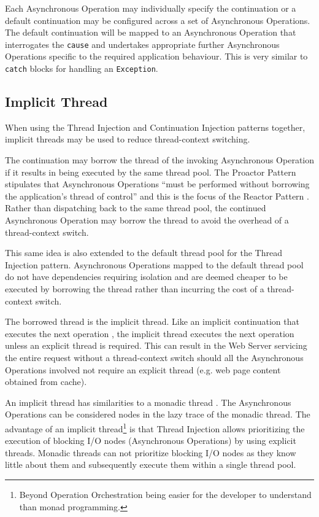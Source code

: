 \documentclass[prodmode]{style/acmlarge}
\begin{document}
Each Asynchronous Operation may individually specify the continuation or a
default continuation may be configured across a set of Asynchronous Operations.
The default continuation will be mapped to an Asynchronous Operation that
interrogates the \texttt{cause} and undertakes appropriate further Asynchronous
Operations specific to the required application behaviour.  This is very similar
to \texttt{catch} blocks for handling an \texttt{Exception}.


\subsection{Implicit Thread}

When using the Thread Injection and Continuation Injection patterns together,
implicit threads may be used to reduce thread-context switching.

The continuation may borrow the thread of the invoking Asynchronous Operation if
it results in being executed by the same thread pool.  The Proactor Pattern
stipulates that Asynchronous Operations ``must be performed without borrowing
the application's thread of control'' \cite[p. 8]{proactor} and this is the
focus of the Reactor Pattern \cite{reactor}.  Rather than dispatching back to
the same thread pool, the continued Asynchronous Operation may borrow the thread
to avoid the overhead of a thread-context switch.

This same idea is also extended to the default thread pool for the Thread
Injection pattern.  Asynchronous Operations mapped to the default thread pool do
not have dependencies requiring isolation and are deemed cheaper to be executed
by borrowing the thread rather than incurring the cost of a thread-context
switch.

The borrowed thread is the implicit thread.  Like an implicit continuation that
executes the next operation \cite{continuations}, the implicit thread executes
the next operation unless an explicit thread is required.  This can result in
the Web Server servicing the entire request without a thread-context switch
should all the Asynchronous Operations involved not require an explicit thread
(e.g. web page content obtained from cache).

An implicit thread has similarities to a monadic thread \cite{monadic-thread}.
The Asynchronous Operations can be considered nodes in the lazy trace of the
monadic thread.  The advantage of an implicit thread\footnote{Beyond Operation
Orchestration being easier for the developer to understand than monad
programming.} is that Thread Injection allows prioritizing the execution of
blocking I/O nodes (Asynchronous Operations) by using explicit threads.  Monadic
threads can not prioritize blocking I/O nodes as they know little about them and
subsequently execute them within a single thread pool.
\end{document}
